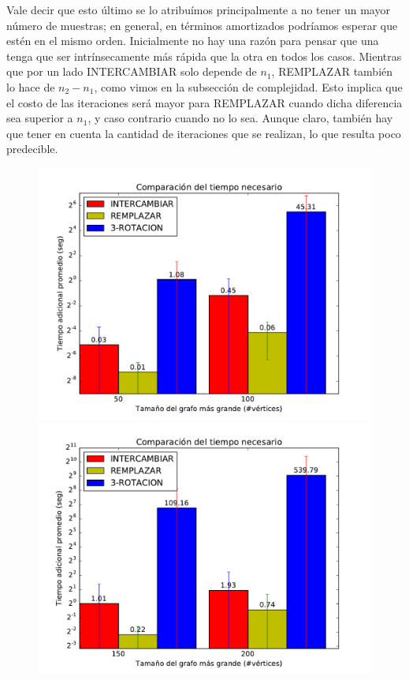 Vale decir que esto último se lo atribuímos principalmente a no tener un mayor número de muestras; en general, en términos amortizados podríamos esperar que estén en el mismo orden. Inicialmente no hay una razón para pensar que una tenga que ser intrínsecamente más rápida que la otra en todos los casos. Mientras que por un lado INTERCAMBIAR solo depende de $n_1$, REMPLAZAR también lo hace de $n_2-n_1$, como vimos en la subsección de complejidad. Esto implica que el costo de las iteraciones será mayor para REMPLAZAR cuando dicha diferencia sea superior a $n_1$, y caso contrario cuando no lo sea. Aunque claro, también hay que tener en cuenta la cantidad de iteraciones que se realizan, lo que resulta poco predecible.  

\begin{figure}[H]
\centering
\begin{minipage}{0.8\textwidth}
  \centering
    \includegraphics[width=1\textwidth]{graficos/problema_5/tiempo0.pdf}
  \caption{}
  \label{fig:5-tiempo1}
\end{minipage}%

\begin{minipage}{0.8\textwidth}   
  \centering
    \includegraphics[width=1\textwidth]{graficos/problema_5/tiempo2.pdf} 
  \caption{}
  \label{fig:5-tiempo2}
\end{minipage}
\end{figure}

